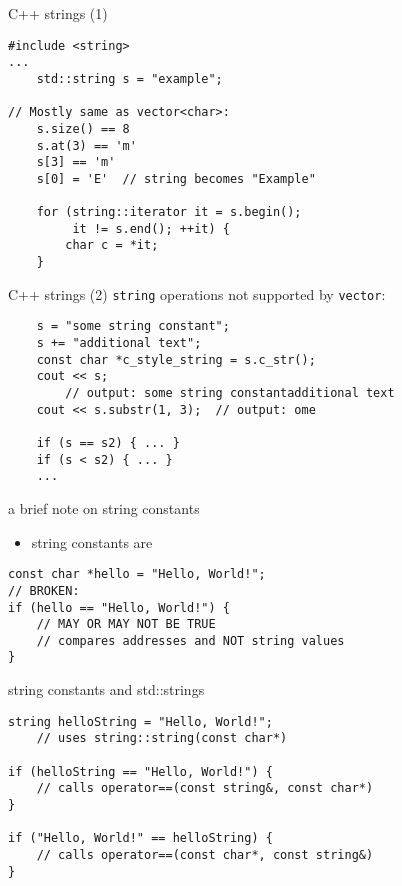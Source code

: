 \begin{frame}[fragile,label=cppStr]{C++ strings (1)}
\lstset{
    language=C++,
    style=small
}
\begin{lstlisting}
#include <string>
...
    std::string s = "example";

// Mostly same as vector<char>:
    s.size() == 8
    s.at(3) == 'm'
    s[3] == 'm'
    s[0] = 'E'  // string becomes "Example"

    for (string::iterator it = s.begin();
         it != s.end(); ++it) {
        char c = *it;
    }
\end{lstlisting}
\end{frame}

\begin{frame}[fragile,label=cppStrAddtl]{C++ strings (2)}
\lstset{
    language=C++,
    style=small
}
\texttt{string} operations not supported by {\tt vector}:
\begin{lstlisting}
    s = "some string constant";
    s += "additional text";
    const char *c_style_string = s.c_str();
    cout << s;
        // output: some string constantadditional text
    cout << s.substr(1, 3);  // output: ome

    if (s == s2) { ... }
    if (s < s2) { ... }
    ...
\end{lstlisting}
\end{frame}

\begin{frame}{a brief note on string constants}
\lstset{
    language=C++,
    style=small
}
    \begin{itemize}
        \item string constants are 
    \end{itemize}
\begin{lstlisting}
const char *hello = "Hello, World!";
// BROKEN:
if (hello == "Hello, World!") {
    // MAY OR MAY NOT BE TRUE
    // compares addresses and NOT string values
}
\end{lstlisting}
\end{frame}

\begin{frame}{string constants and std::strings}
\lstset{
    language=C++,
    style=small
}
\begin{lstlisting}
string helloString = "Hello, World!";
    // uses string::string(const char*)

if (helloString == "Hello, World!") {
    // calls operator==(const string&, const char*)
}

if ("Hello, World!" == helloString) {
    // calls operator==(const char*, const string&)
}
\end{lstlisting}
\end{frame}
